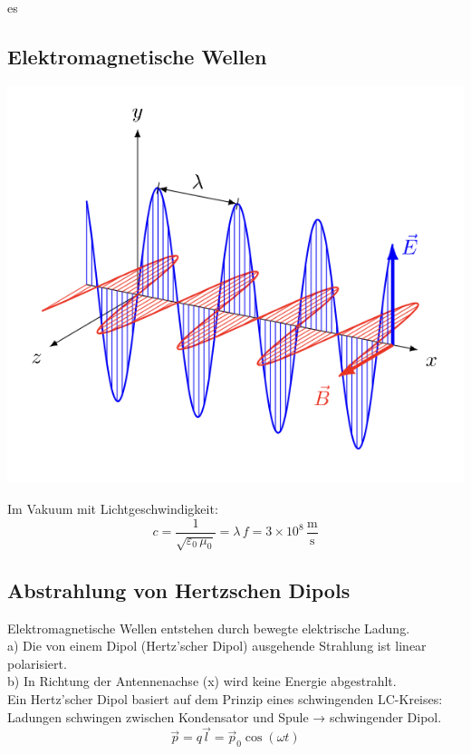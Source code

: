 es\documentclass[a4paper, fontsize=8pt, landscape]{scrartcl}
\begin{document}
\begin{multicols*}{4}
\section{Elektromagnetische Wellen}
\begin{center}
    \includegraphics[scale=0.38]{Images/elektrowellen.png}
\end{center}

    Im Vakuum mit Lichtgeschwindigkeit:
    \[c = \frac{1}{\sqrt{\varepsilon_0 \,\mu_0}} = \lambda\,f = 3 \times 10^8 \,\frac{\text{m}}{\text{s}}\]

\subsection{Abstrahlung von Hertzschen Dipols}
    Elektromagnetische Wellen entstehen durch bewegte elektrische Ladung.\\
    a) Die von einem Dipol (Hertz’scher Dipol) ausgehende Strahlung ist linear polarisiert.\\
    b) In Richtung der Antennenachse (x) wird keine Energie abgestrahlt.\\

    Ein Hertz’scher Dipol basiert auf dem Prinzip eines schwingenden LC-Kreises: Ladungen schwingen zwischen Kondensator und Spule → schwingender Dipol.
    \[\vec p  = q \vec l = \vec p_0 \cos(\omega t) \]

\end{multicols*}
\end{document}
